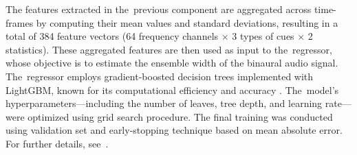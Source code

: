 The features extracted in the~previous component are aggregated across time-frames by computing their mean values and standard deviations, resulting in a total of 384 feature vectors (64 frequency channels $\times$ 3 types of cues $\times$ 2 statistics). These aggregated features are then used as input to the~regressor, whose objective is to estimate the ensemble width of the binaural audio signal. The~regressor employs gradient-boosted decision trees implemented with LightGBM, known for its computational efficiency and accuracy \cite{ke_lightgbm_2017}. The~model's hyperparameters---including the number of leaves, tree depth, and learning rate---were optimized using grid search procedure. The final training was conducted using validation set and early-stopping technique based on mean absolute error. For further details, see~\cite{antoniuk_ensemble_2024}.
